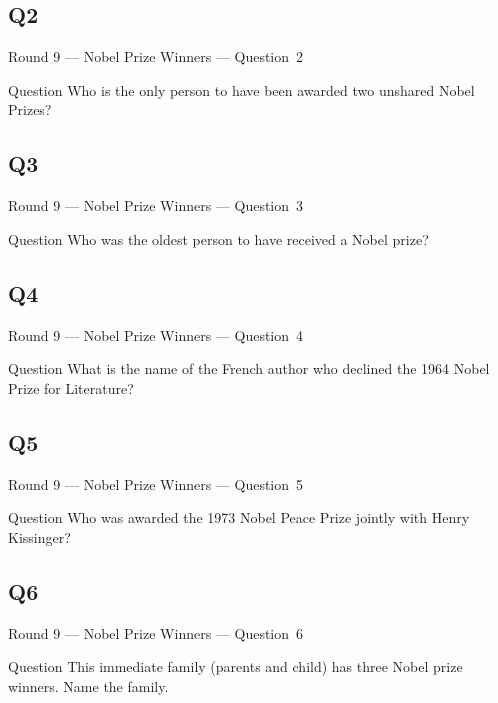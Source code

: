 \documentclass[11pt]{beamer}
\begin{document}
\subsection*{Q2}
\begin{frame}[t]{Round 9 --- Nobel Prize Winners --- \mbox{Question 2}}
\vspace{-0.5em}
\begin{block}{Question}
Who is the only person to have been awarded two unshared Nobel Prizes? 
\end{block}
\end{frame}
\subsection*{Q3}
\begin{frame}[t]{Round 9 --- Nobel Prize Winners --- \mbox{Question 3}}
\vspace{-0.5em}
\begin{block}{Question}
Who was the oldest person to have received a Nobel prize?
\end{block}
\end{frame}
\subsection*{Q4}
\begin{frame}[t]{Round 9 --- Nobel Prize Winners --- \mbox{Question 4}}
\vspace{-0.5em}
\begin{block}{Question}
What is the name of the French author who declined the 1964 Nobel Prize for Literature?
\end{block}
\end{frame}
\subsection*{Q5}
\begin{frame}[t]{Round 9 --- Nobel Prize Winners --- \mbox{Question 5}}
\vspace{-0.5em}
\begin{block}{Question}
Who was awarded the 1973 Nobel Peace Prize jointly with Henry Kissinger?
\end{block}
\end{frame}
\subsection*{Q6}
\begin{frame}[t]{Round 9 --- Nobel Prize Winners --- \mbox{Question 6}}
\vspace{-0.5em}
\begin{block}{Question}
This immediate family (parents and child) has three Nobel prize winners.  Name the family.
\end{block}
\end{frame}
\end{document}
